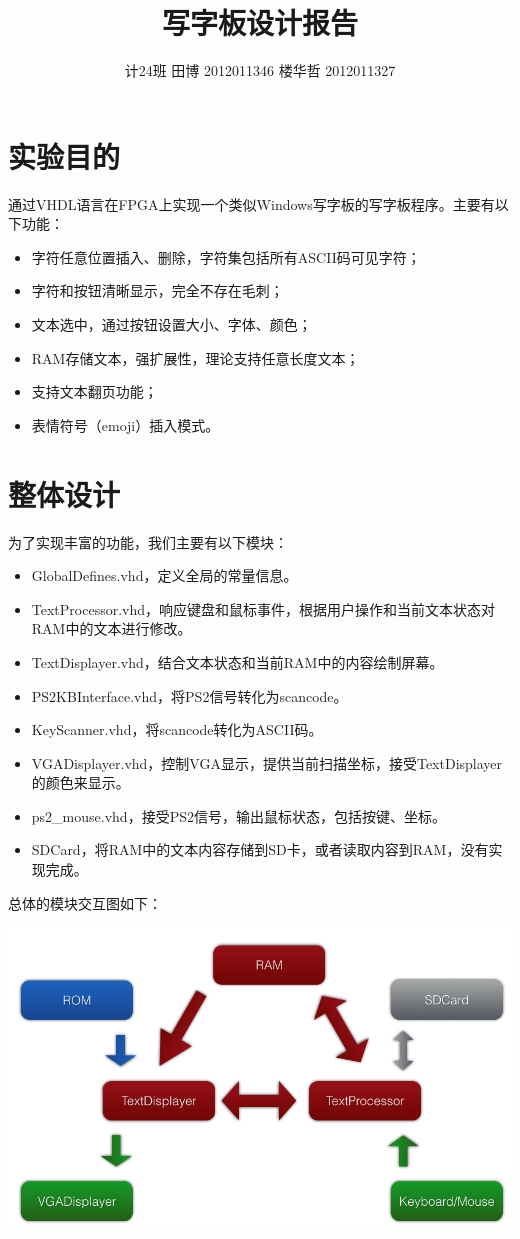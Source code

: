 \documentclass[12pt,a4paper]{article}
\title{写字板设计报告}
\author{计24班{} 田博{} 2012011346{} 楼华哲{} 2012011327}
\begin{document}
\maketitle

\section{实验目的}
通过VHDL语言在FPGA上实现一个类似Windows写字板的写字板程序。主要有以下功能：

\begin{itemize}
	\item 字符任意位置插入、删除，字符集包括所有ASCII码可见字符；
	\item 字符和按钮清晰显示，完全不存在毛刺；
	\item 文本选中，通过按钮设置大小、字体、颜色；
	\item RAM存储文本，强扩展性，理论支持任意长度文本；
	\item 支持文本翻页功能；
	\item 表情符号（emoji）插入模式。
\end{itemize}

\section{整体设计} %
\label{sec:整体设计}
为了实现丰富的功能，我们主要有以下模块：

\begin{itemize}
	\item GlobalDefines.vhd，定义全局的常量信息。
	\item TextProcessor.vhd，响应键盘和鼠标事件，根据用户操作和当前文本状态对RAM中的文本进行修改。
	\item TextDisplayer.vhd，结合文本状态和当前RAM中的内容绘制屏幕。
	\item PS2KBInterface.vhd，将PS2信号转化为scancode。
	\item KeyScanner.vhd，将scancode转化为ASCII码。
	\item VGADisplayer.vhd，控制VGA显示，提供当前扫描坐标，接受TextDisplayer的颜色来显示。
	\item ps2\_mouse.vhd，接受PS2信号，输出鼠标状态，包括按键、坐标。
	\item SDCard，将RAM中的文本内容存储到SD卡，或者读取内容到RAM，没有实现完成。
\end{itemize}

总体的模块交互图如下：

\includegraphics[width=\textwidth]{wordpad1.png}
\end{document}
